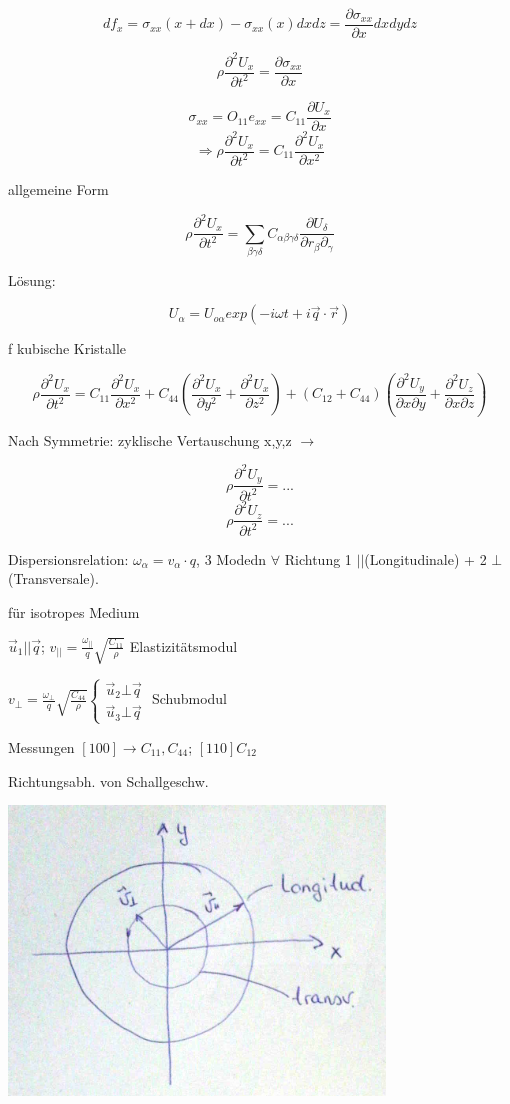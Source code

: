 \[ df_x = \sigma_{xx}(x+dx) - \sigma_{xx}(x)dxdz =
\frac{\partial\sigma_{xx}}{\partial x}dxdydz \]

\[ \rho \frac{\partial^2 U_x}{\partial t^2} =
\frac{\partial\sigma_{xx}}{\partial x} \]

\[ \sigma_{xx} = O_{11}e_{xx} = C_{11}\frac{\partial U_x}{\partial x} \]
\[ \Rightarrow  \rho \frac{\partial^2 U_x}{\partial t^2} = C_{11}\frac{\partial^2 U_x}{\partial x^2}\]

allgemeine Form  

\[\rho \frac{\partial^2 U_x}{\partial t^2} =  \sum_{\beta\gamma\delta} C_{\alpha\beta\gamma\delta}\frac{\partial U_\delta}{\partial r_\beta\partial_\gamma} \]

Lösung:

\[ U_\alpha = U_{o\alpha}exp(-i\omega t + i \vec q\cdot \vec r )\]

f kubische Kristalle

\[\rho \frac{\partial^2 U_x}{\partial t^2} =  C_{11}\frac{\partial^2 U_x}{\partial x^2} + C_{44}\left(\frac{\partial^2 U_x}{\partial y^2}+\frac{\partial^2 U_x}{\partial z^2} \right) + (C_{12}+C_{44}) \left(\frac{\partial^2 U_y}{\partial x\partial y}+\frac{\partial^2 U_z}{\partial x \partial z} \right) \]

Nach Symmetrie: zyklische Vertauschung x,y,z \(\rightarrow\)


\[ \rho \frac{\partial^2 U_y}{\partial t^2} = ...\]
\[ \rho \frac{\partial^2 U_z}{\partial t^2} = ...\]

Dispersionsrelation: \(\omega_\alpha = v_\alpha\cdot q\), 3 Modedn \(\forall\) Richtung 1 \(||\)(Longitudinale) + 2 \(\bot\)(Transversale).

für isotropes Medium

\(\vec u_1 || \vec q\); \(v_{||} = \frac{\omega_{||}}{q}\sqrt{\frac{C_{11}}{\rho}}\) Elastizitätsmodul

\(
v_{\bot}= \frac{\omega_{\bot}}{q}\sqrt{\frac{C_{44}}{\rho}}\begin{cases}
 \vec u_2 \bot \vec q\\
 \vec u_3 \bot \vec q
\end{cases}
\) Schubmodul

Messungen \([100] \rightarrow C_{11},C_{44}\); \([110] C_{12}\)

Richtungsabh. von Schallgeschw.


\includegraphics[width=0.75\textwidth]{kap05_02.png}


